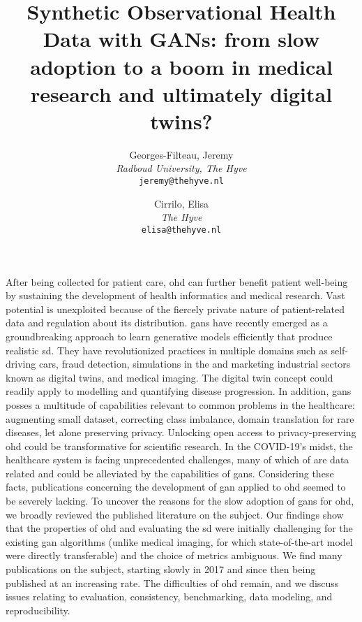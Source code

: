 \documentclass[10pt]{article}
\title{ Synthetic Observational Health Data with GANs: from slow adoption to a boom in medical research and ultimately digital twins?}
\author{
  Georges-Filteau, Jeremy \href{https://orcid.org/0000-0002-0352-6468}{}\\[0.2cm]
  \small \textit{Radboud University, The Hyve}\\
  \small\texttt{jeremy@thehyve.nl}
  \and
  Cirrilo, Elisa \href{https://orcid.org/0000-0002-0241-7833}{}\\[0.2cm]
  \small \textit{The Hyve}\\
  \small\texttt{elisa@thehyve.nl}
}
\renewenvironment{abstract}
 {{\noindent\bfseries{\abstractname}\par\nobreak}\footnotesize}
 {\bigskip}
\begin{document}
    \maketitle
    \vspace{-1em}

    \begingroup
    \let\center\flushleft
    \let\endcenter\endflushleft
    \maketitle
    \endgroup


    \glsresetall
    \begin{abstract}
    After being collected for patient care, \gls{ohd} can further benefit patient well-being by sustaining the development of health informatics and medical research. Vast potential is unexploited because of the fiercely private nature of patient-related data and regulation about its distribution. 
    \glspl{gan} have recently emerged as a groundbreaking approach to learn generative models efficiently that produce realistic \gls{sd}. They have revolutionized practices in multiple domains such as self-driving cars, fraud detection, simulations in the and marketing industrial sectors known as digital twins, and medical imaging. The digital twin concept could readily apply to modelling and quantifying disease progression. In addition, \glspl{gan} posses a multitude of capabilities relevant to common problems in the healthcare: augmenting small dataset, correcting class imbalance, domain translation for rare diseases, let alone preserving privacy. Unlocking open access to privacy-preserving \gls{ohd} could be transformative for scientific research. In the COVID-19's midst, the healthcare system is facing unprecedented challenges, many of which of are data related and could be alleviated by the capabilities of \glspl{gan}.
   Considering these facts, publications concerning the development of  \gls{gan} applied to \gls{ohd} seemed to be severely lacking. To uncover the reasons for the slow adoption of \glspl{gan} for \gls{ohd}, we broadly reviewed the published literature on the subject. Our findings show that the properties of \gls{ohd} and evaluating the \gls{sd} were initially challenging for the existing \gls{gan} algorithms (unlike medical imaging, for which state-of-the-art model were directly transferable) and the choice of metrics ambiguous. We find many publications on the subject, starting slowly in 2017 and since then being published at an increasing rate. The difficulties of \gls{ohd} remain, and we discuss issues relating to evaluation, consistency, benchmarking, data modeling, and reproducibility.
    \end{abstract}

    
    
    
    
    
    

    \pagebreak

    \printglossary[type=oalgo]
    \printglossary[type=\acronymtype]

    \pagebreak

    
\end{document}
